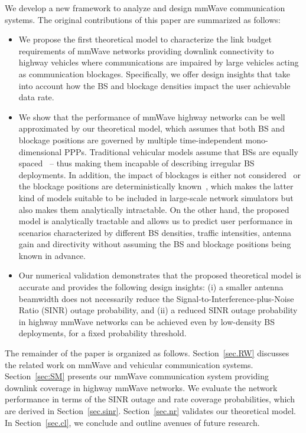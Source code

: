 \documentclass[10pt,journal,a4paper]{IEEEtran}
\begin{document}
We develop a new framework to analyze and design mmWave communication systems. The original contributions of this paper are summarized as follows:
\begin{itemize}
\item We propose the first theoretical model to characterize the link budget requirements of mmWave networks providing downlink connectivity to highway vehicles where communications are impaired by large vehicles acting as communication blockages. Specifically, we offer design insights that take into account how the BS and blockage densities impact the user achievable data rate.
\item We show that the performance of mmWave highway networks can be well approximated by our theoretical model, which assumes that both BS and blockage positions are governed by multiple time-independent mono-dimensional PPPs.
{Traditional vehicular models assume that BSs are equally spaced~\cite{RW0} -- thus making them incapable of describing irregular BS deployments. In addition, the impact of blockages is either not considered~\cite{RW2} or the blockage positions are deterministically known~\cite{RW1}, which makes the latter kind of models suitable to be included in large-scale network simulators but also makes them analytically intractable. On the other hand, the proposed model is analytically tractable and allows us to predict user performance in scenarios characterized by different BS densities, traffic intensities, antenna gain and directivity without assuming the BS and blockage positions being known in advance.}
\item {Our numerical validation demonstrates that the proposed theoretical model is accurate and provides the following design insights: (i) a smaller antenna beamwidth does not necessarily reduce the Signal-to-Interference-plus-Noise Ratio (SINR) outage probability, and (ii) a reduced SINR outage probability in highway mmWave networks can be achieved even by low-density BS deployments, for a fixed probability threshold.}
\end{itemize}

The remainder of the paper is organized as follows. Section~\ref{sec.RW} discusses the related work on mmWave and vehicular communication systems. Section~\ref{sec:SM} presents our mmWave communication system providing downlink coverage in highway mmWave networks. 
We evaluate the network performance in terms of the SINR outage and rate coverage probabilities, which are derived in Section~\ref{sec.sinr}. Section~\ref{sec.nr} validates our theoretical model. In Section~\ref{sec.cl}, we conclude and outline avenues of future research.
\end{document}
